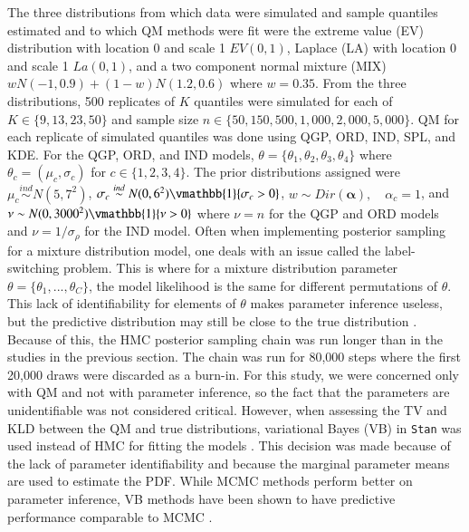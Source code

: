 \documentclass[preprint,12pt,authoryear]{elsarticle}
\begin{document}
The three distributions from which data were simulated and sample quantiles 
estimated and to which QM methods were fit were the extreme value (EV) 
distribution with location 0 and scale 1 $EV(0,1)$, Laplace (LA) with location 
0 and scale 1 $La(0,1)$, and a two component normal mixture (MIX) 
$w N(-1, 0.9) + (1-w)N(1.2, 0.6)$ where $w = 0.35$. From the three 
distributions, 500 replicates of $K$ quantiles were simulated for each of 
$K \in \{9, 13, 23, 50\}$ and sample size 
$n \in \{50, 150, 500, 1{,}000, 2{,}000, 5{,}000\}$. QM for each replicate of 
simulated quantiles was done using QGP, ORD, IND, SPL, and KDE. For the QGP, 
ORD, and IND models, $\theta = \{\theta_1, \theta_2, \theta_3, \theta_4\}$ 
where $\theta_c = (\mu_c, \sigma_c)$ for $c \in \{1,2,3,4\}$. The prior 
distributions assigned were $\mu_c \overset{ind}{\sim} N(5, 7^2)$,
$\sigma_c \overset{ind}{\sim} N(0, 6^2)\vmathbb{1}\{\sigma_c > 0\}$,
$w \sim Dir(\boldsymbol{\alpha}), \quad \alpha_c = 1$, and
$\nu \sim N(0, 3000^2)\vmathbb{1}\{\nu > 0\}$
where $\nu = n$ for the QGP and ORD models 
and $\nu = 1/\sigma_{\rho}$ for the IND model. 
Often when implementing posterior sampling for a mixture distribution model, one deals with an issue called the label-switching problem. This is where for a mixture distribution parameter $\theta = \{\theta_1,...,\theta_C\}$, the model likelihood is the same for different permutations of $\theta$. This lack of identifiability for elements of $\theta$ makes parameter inference useless, but the predictive distribution may still be close to the true distribution \cite[]{stephens2000dealing}.
Because of this, the HMC posterior sampling chain was run longer than in the studies in the previous section. The chain was run for 80,000 steps where the first 20,000 draws were discarded as a burn-in. For this study, we were concerned only with QM and not with parameter inference, so the fact that the parameters are unidentifiable was not considered critical. However, when assessing the TV and KLD between the QM and true distributions, variational Bayes (VB) in \texttt{Stan} was used instead of HMC for fitting the models \cite[]{kucukelbir2015automatic}. This decision was made because of the lack of parameter identifiability and because the marginal parameter means are used to estimate the PDF. While MCMC methods perform better on parameter inference, VB methods have been shown to have predictive performance comparable to MCMC \cite[]{blei2017variational}.
\end{document}
